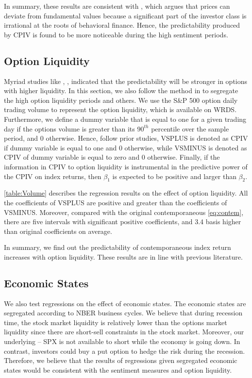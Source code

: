 In summary, these results are consistent with \textcite{baker2006investor}, which argues that prices can deviate from fundamental values because a significant part of the investor class is irrational at the roots of behavioral finance. Hence, the predictability produced by CPIV is found to be more noticeable during the high sentiment periods.  

\subsection{Option Liquidity}

Myriad studies like \textcite{easley1998option}, \textcite{cremers2010deviations}, \textcite{driessen2012option} indicated that the predictability will be stronger in options with higher liquidity. In this section, we also follow the method in \textcite{chang2018implied} to segregate the high option liquidity periods and others. We use the S\&P 500 option daily trading volume to represent the option liquidity, which is available on WRDS. Furthermore, we define a dummy variable that is equal to one for a given trading day if the options volume is greater than its $90^{th}$ percentile over the sample period, and 0 otherwise. Hence, follow prior studies, VSPLUS is denoted as CPIV if dummy variable is equal to one and 0 otherwise, while VSMINUS is denoted as CPIV of dummy variable is equal to zero and 0 otherwise. Finally, if the information in CPIV to option liquidity is instrumental in the predictive power of the CPIV on index returns, then $\beta _{1}$ is expected to be positive and larger than $\beta _{2}$.

\autoref{table:Volume} describes the regression results on the effect of option liquidity. All the coefficients of VSPLUS are positive and greater than the coefficients of VSMINUS. Moreover, compared with the original contemporaneous \autoref{eq:contem}, there are five intervals with significant positive coefficients, and 3.4 basis higher than original coefficients on average. 

In summary, we find out the predictability of contemporaneous index return increases with option liquidity. These results are in line with previous literature. 

\subsection{Economic States}

We also test regressions on the effect of economic states. The economic states are segregated according to NBER business cycles. We believe that during recession time, the stock market liquidity is relatively lower than the options market liquidity since there are short-sell constraints in the stock market. Moreover, our underlying -- SPX is not available to short while the economy is going down. In contrast, investors could buy a put option to hedge the risk during the recession. Therefore, we believe that the results of regressions given segregated economic states would be consistent with the sentiment measures and option liquidity.  

